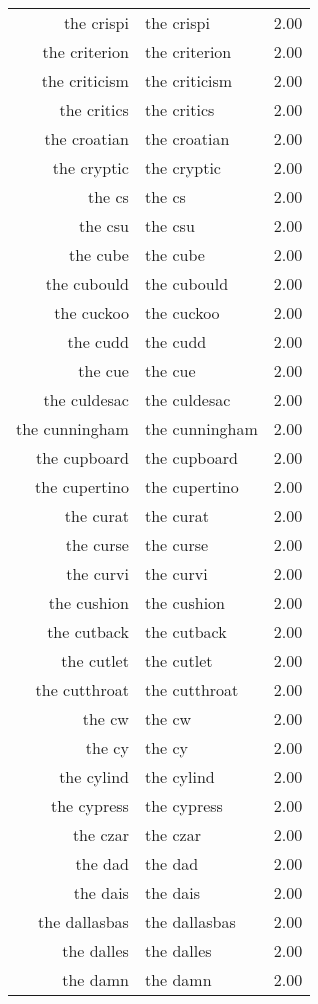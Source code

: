 \begin{table}[ht]
\begin{tabular}{rlr}
  the crispi & the crispi & 2.00 \\ 
  the criterion & the criterion & 2.00 \\ 
  the criticism & the criticism & 2.00 \\ 
  the critics & the critics & 2.00 \\ 
  the croatian & the croatian & 2.00 \\ 
  the cryptic & the cryptic & 2.00 \\ 
  the cs & the cs & 2.00 \\ 
  the csu & the csu & 2.00 \\ 
  the cube & the cube & 2.00 \\ 
  the cubould & the cubould & 2.00 \\ 
  the cuckoo & the cuckoo & 2.00 \\ 
  the cudd & the cudd & 2.00 \\ 
  the cue & the cue & 2.00 \\ 
  the culdesac & the culdesac & 2.00 \\ 
  the cunningham & the cunningham & 2.00 \\ 
  the cupboard & the cupboard & 2.00 \\ 
  the cupertino & the cupertino & 2.00 \\ 
  the curat & the curat & 2.00 \\ 
  the curse & the curse & 2.00 \\ 
  the curvi & the curvi & 2.00 \\ 
  the cushion & the cushion & 2.00 \\ 
  the cutback & the cutback & 2.00 \\ 
  the cutlet & the cutlet & 2.00 \\ 
  the cutthroat & the cutthroat & 2.00 \\ 
  the cw & the cw & 2.00 \\ 
  the cy & the cy & 2.00 \\ 
  the cylind & the cylind & 2.00 \\ 
  the cypress & the cypress & 2.00 \\ 
  the czar & the czar & 2.00 \\ 
  the dad & the dad & 2.00 \\ 
  the dais & the dais & 2.00 \\ 
  the dallasbas & the dallasbas & 2.00 \\ 
  the dalles & the dalles & 2.00 \\ 
  the damn & the damn & 2.00 \\ 

\end{tabular}
\end{table}
